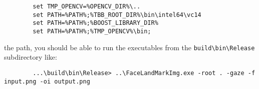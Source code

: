 \documentclass{tufte-handout}
\begin{document}
    \begin{lstlisting}
        set TMP_OPENCV=%OPENCV_DIR%\..
        set PATH=%PATH%;%TBB_ROOT_DIR%\bin\intel64\vc14
        set PATH=%PATH%;%BOOST_LIBRARY_DIR%
        set PATH=%PATH%;%TMP_OPENCV%\bin;
    \end{lstlisting}
   
    \break

     the path, you should be able to run the executables from the 
    \Verb|build\bin\Release| subdirectory like:

    \begin{lstlisting}
        ...\build\bin\Release> ..\FaceLandMarkImg.exe -root . -gaze -f input.png -oi output.png
    \end{lstlisting}
\end{document}
